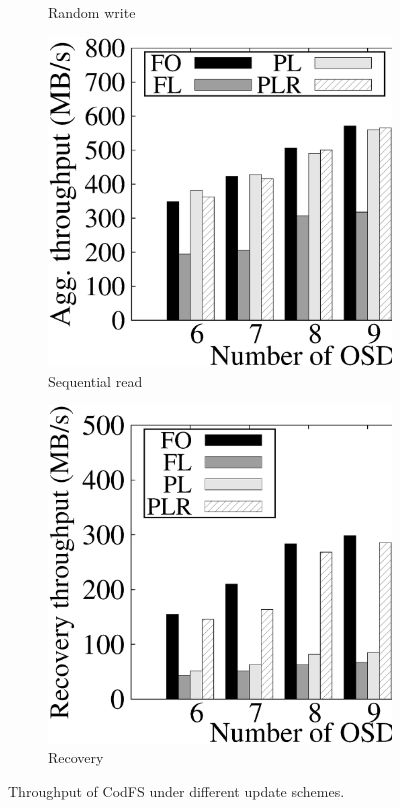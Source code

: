 \begin{figure}[t]
\begin{subfigure}[t]{0.48\linewidth}
     \caption{Random write}
	 \label{fig:rand_write}
 \end{subfigure}
 \begin{subfigure}[t]{0.48\linewidth}
     \includegraphics[width=\linewidth]{charts/seq_read/eps/seq_read}
     \caption{Sequential read}
	 \label{fig:seq_read}
 \end{subfigure}
 \begin{subfigure}[t]{0.48\linewidth}
     \includegraphics[width=\linewidth]{charts/recovery/eps/recovery}
     \caption{Recovery}
	 \label{fig:recovery}
 \end{subfigure}
 \caption{Throughput of CodFS under different update schemes.}
 \label{fig:update_schemes}
\end{figure}

